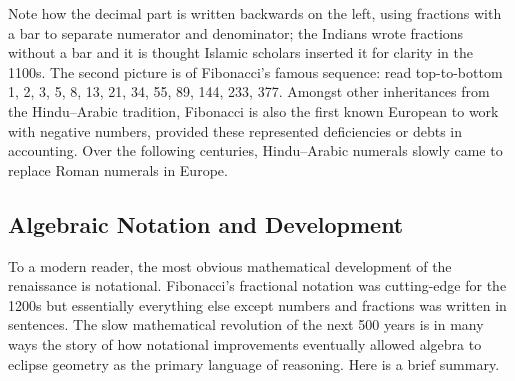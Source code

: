 Note how the decimal part is written backwards on the left, using fractions with a bar to separate numerator and denominator; the Indians wrote fractions without a bar and it is thought Islamic scholars inserted it for clarity in the 1100s. The second picture is of Fibonacci's famous sequence: read top-to-bottom 1, 2, 3, 5, 8, 13, 21, 34, 55, 89, 144, 233, 377. Amongst other inheritances from the Hindu--Arabic tradition, Fibonacci is also the first known European to work with negative numbers, provided these represented deficiencies or debts in accounting. Over the following centuries, Hindu--Arabic numerals slowly came to replace Roman numerals in Europe.



\clearpage



\subsection{Algebraic Notation and Development}

To a modern reader, the most obvious mathematical development of the renaissance is notational. Fibonacci's fractional notation was cutting-edge for the 1200s but essentially everything else except numbers and fractions was written in sentences. The slow mathematical revolution of the next 500 years is in many ways the story of how notational improvements eventually allowed algebra to eclipse geometry as the primary language of reasoning. Here is a brief summary.

